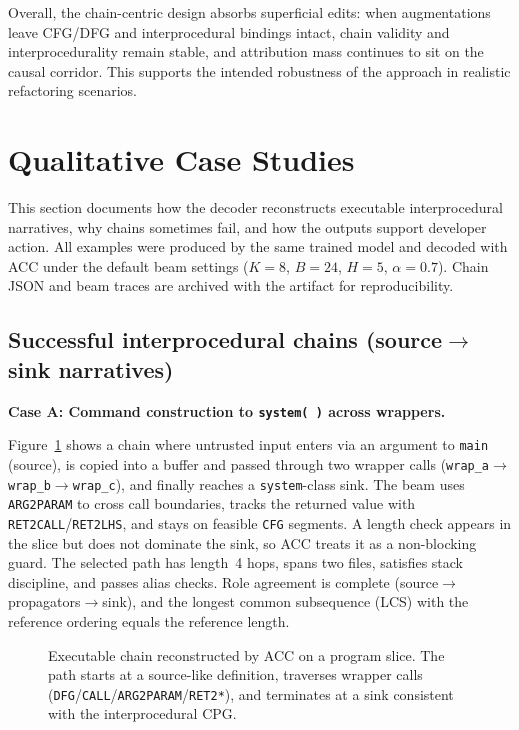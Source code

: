\documentclass{buthesis}
\begin{document}
Overall, the chain-centric design absorbs superficial edits: when augmentations leave CFG/DFG and interprocedural bindings intact, chain validity and interprocedurality remain stable, and attribution mass continues to sit on the causal corridor. This supports the intended robustness of the approach in realistic refactoring scenarios.



\section{Qualitative Case Studies}
\label{sec:results-qual}

This section documents how the decoder reconstructs executable interprocedural narratives, why chains sometimes fail, and how the outputs support developer action. All examples were produced by the same trained model and decoded with ACC under the default beam settings ($K{=}8$, $B{=}24$, $H{=}5$, $\alpha{=}0.7$). Chain JSON and beam traces are archived with the artifact for reproducibility.

\subsection{Successful interprocedural chains (source$\to$sink narratives)}
\label{subsec:qual-success}

\textbf{Case A: Command construction to \texttt{system(\,)} across wrappers.}

Figure~\ref{fig:demo-chain} shows a chain where untrusted input enters via an argument to \texttt{main} (source), is copied into a buffer and passed through two wrapper calls (\texttt{wrap\_a}$\to$\texttt{wrap\_b}$\to$\texttt{wrap\_c}), and finally reaches a \texttt{system}-class sink. The beam uses \texttt{ARG2PARAM} to cross call boundaries, tracks the returned value with \texttt{RET2CALL}/\texttt{RET2LHS}, and stays on feasible \texttt{CFG} segments. A length check appears in the slice but does not dominate the sink, so ACC treats it as a non-blocking guard. The selected path has length~4 hops, spans two files, satisfies stack discipline, and passes alias checks. Role agreement is complete (source$\to$propagators$\to$sink), and the longest common subsequence (LCS) with the reference ordering equals the reference length.


\begin{figure}[H]
	\centering
	
	\caption{Executable chain reconstructed by ACC on a program slice. The path starts at a source-like definition, traverses wrapper calls (\texttt{DFG}/\texttt{CALL}/\texttt{ARG2PARAM}/\texttt{RET2*}), and terminates at a sink consistent with the interprocedural CPG.}
	\label{fig:demo-chain}
\end{figure}
\end{document}
